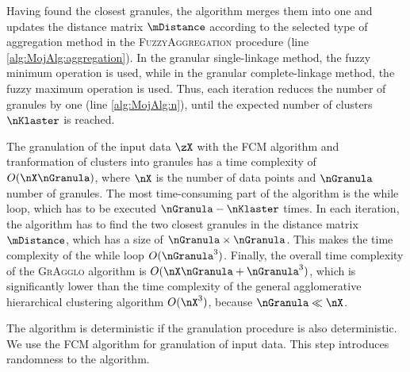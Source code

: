 \documentclass{amcs}
\newcommand{\procedura}[1]{\textsc{#1}}
\newcommand{\MojAlg}{\procedura{GrAgglo}}
\newcommand{\FuzzyAggregation}{\procedura{FuzzyAggregation}}
\begin{document}
Having found the closest granules, the algorithm merges them into one and updates the distance matrix $\mDistance$ according to the selected type of aggregation method in the \FuzzyAggregation{} procedure (line \ref{alg:MojAlg:aggregation}).
In the granular single-linkage method, the fuzzy minimum operation is used, while in the granular complete-linkage method, the fuzzy maximum operation is used.
Thus, each iteration reduces the number of granules by one (line \ref{alg:MojAlg:n}), until the expected number of clusters $\nKlaster$ is reached.

The granulation of the input data $\zX$ with the FCM algorithm and tranformation of clusters into granules has a time complexity of $O(\nX\nGranula)$, where $\nX$ is the number of data points and $\nGranula$ number of granules.
The most time-consuming part of the algorithm is the while loop, which has to be executed $\nGranula - \nKlaster$ times. 
In each iteration, the algorithm has to find the two closest granules in the distance matrix $\mDistance$, which has a size of $\nGranula \times \nGranula$.
This makes the time complexity of the while loop $O(\nGranula^3)$. 
Finally, the overall time complexity of the \MojAlg{} algorithm is $O(\nX\nGranula + \nGranula^3)$, which is significantly lower than the time complexity of the general agglomerative hierarchical clustering algorithm $O(\nX^3)$, because $\nGranula \ll \nX$.


The algorithm is deterministic if the granulation procedure is also deterministic.
We use the FCM algorithm for granulation of input data. This step introduces randomness to the algorithm.

 
 
\end{document}
